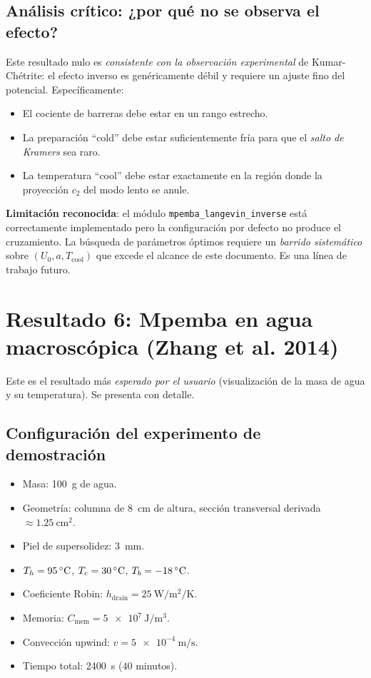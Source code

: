 \subsection{Análisis crítico: ¿por qué no se observa el efecto?}

Este resultado nulo es \emph{consistente con la observación experimental} de 
Kumar-Chétrite: el efecto inverso es genéricamente débil y requiere un ajuste 
fino del potencial. Específicamente:
\begin{itemize}
\item El cociente de barreras debe estar en un rango estrecho.
\item La preparación ``cold'' debe estar suficientemente fría para que el 
\emph{salto de Kramers} sea raro.
\item La temperatura ``cool'' debe estar exactamente en la región donde la 
proyección $c_2$ del modo lento se anule.
\end{itemize}

\textbf{Limitación reconocida}: el módulo \texttt{mpemba\_langevin\_inverse} 
está correctamente implementado pero la configuración por defecto no produce 
el cruzamiento. La búsqueda de parámetros óptimos requiere un \emph{barrido 
sistemático} sobre $(U_0, a, T_{\mathrm{cool}})$ que excede el alcance de este 
documento. Es una línea de trabajo futuro.

\section{Resultado 6: Mpemba en agua macroscópica (Zhang et al. 2014)}

Este es el resultado más \emph{esperado por el usuario} (visualización de la 
masa de agua y su temperatura). Se presenta con detalle.

\subsection{Configuración del experimento de demostración}

\begin{itemize}
\item Masa: \SI{100}{\gram} de agua.
\item Geometría: columna de \SI{8}{\centi\meter} de altura, sección transversal 
derivada $\approx \SI{1.25}{\centi\meter\squared}$.
\item Piel de supersolidez: \SI{3}{\milli\meter}.
\item $T_{h} = \SI{95}{\celsius}$, $T_{c} = \SI{30}{\celsius}$, 
$T_{b} = \SI{-18}{\celsius}$.
\item Coeficiente Robin: $h_{\mathrm{drain}} = \SI{25}{\watt\per\meter\squared\per\kelvin}$.
\item Memoria: $C_{\mathrm{mem}} = \SI{5e7}{\joule\per\meter\cubed}$.
\item Convección upwind: $v = \SI{5e-4}{\meter\per\second}$.
\item Tiempo total: \SI{2400}{\second} ($40$ minutos).
\end{itemize}

